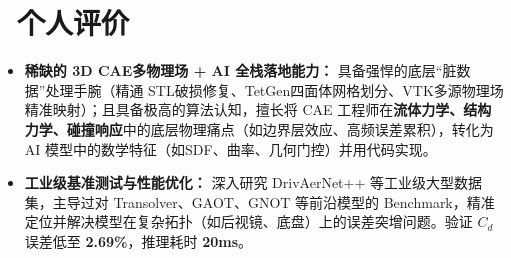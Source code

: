 \documentclass[11pt]{article}
\begin{document}
\section{\makebox[\widthof{\faUser}][c]{\color{CVBlue}\faUser}\ 个人评价}

\begin{itemize}
    \item \textbf{稀缺的 3D CAE多物理场 + AI 全栈落地能力：} 具备强悍的底层“脏数据”处理手腕（精通 STL破损修复、TetGen四面体网格划分、VTK多源物理场精准映射）；且具备极高的算法认知，擅长将 CAE 工程师在\textbf{流体力学、结构力学、碰撞响应}中的底层物理痛点（如边界层效应、高频误差累积），转化为 AI 模型中的数学特征（如SDF、曲率、几何门控）并用代码实现。
    \item \textbf{工业级基准测试与性能优化：} 深入研究 DrivAerNet++ 等工业级大型数据集，主导过对 Transolver、GAOT、GNOT 等前沿模型的 Benchmark，精准定位并解决模型在复杂拓扑（如后视镜、底盘）上的误差突增问题。验证 $C_d$ 误差低至 \textbf{2.69\%}，推理耗时 \textbf{20ms}。
\end{itemize}
\end{document}
